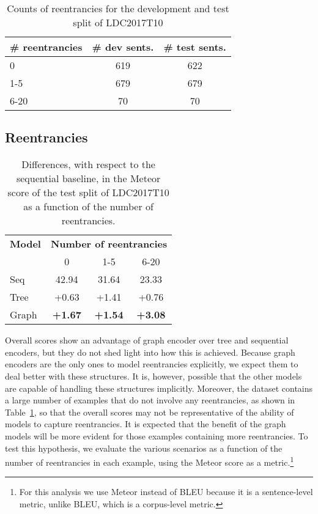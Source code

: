 \documentclass[11pt,a4paper]{article}
\begin{document}
\begin{table}
\centering
\begin{tabular}{lcc}
\toprule
\textbf{\# reentrancies} & \textbf{\# dev sents.} & \textbf{\# test sents.}\\
\midrule
0 & 619 & 622 \\
1-5 & 679 & 679 \\
6-20 & 70 & 70 \\
\bottomrule
\end{tabular}
\caption{Counts of reentrancies for the development and test split of LDC2017T10}
\label{tab:stats_reentrancies}
\end{table}

\subsection{Reentrancies}
\label{sec:reentrancies}
\begin{table}
\centering
\begin{tabular}{lccc}
\toprule
\textbf{Model} & \multicolumn{3}{c}{\textbf{Number of reentrancies}}\\
& 0 & 1-5 & 6-20\\
\midrule
{\sc Seq} & 42.94 & 31.64 & 23.33 \\
{\sc Tree} & +0.63 & +1.41 & +0.76 \\ 
{\sc Graph} & \textbf{+1.67} & \textbf{+1.54} & \textbf{+3.08} \\
\bottomrule
\end{tabular}
\caption{Differences, with respect to the sequential baseline, in the Meteor score of the test split of LDC2017T10 as a function of the number of reentrancies.}
\label{tab:diff_reentr}
\end{table}

Overall scores show an advantage of graph encoder over tree and sequential encoders, but they do not shed light into how this is achieved. Because graph encoders are the only ones to model reentrancies explicitly, we expect them to deal better with these structures. It is, however, possible that the other models are capable of handling these structures implicitly. Moreover, the dataset contains a large number of examples that do not involve any reentrancies, as shown in Table~\ref{tab:stats_reentrancies}, so that the overall scores may not be representative of the ability of models to capture reentrancies.
It is expected that the benefit of the graph models will be more evident for those examples containing more reentrancies. To test this hypothesis, we evaluate the various scenarios as a function of the number of reentrancies in each example, using the Meteor score as a metric.\footnote{For this analysis we use Meteor instead of BLEU because it is a sentence-level metric, unlike BLEU, which is a corpus-level metric.}
\end{document}
